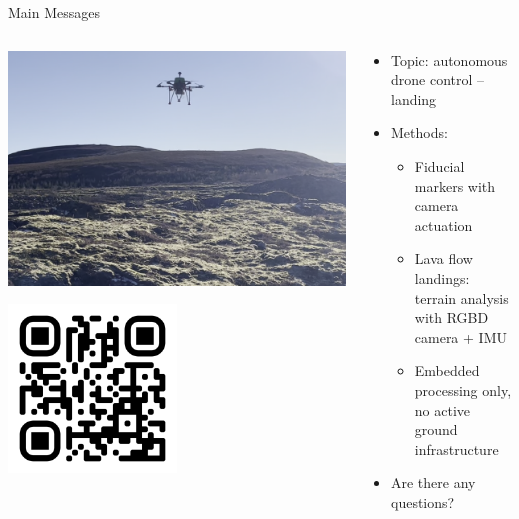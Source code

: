\documentclass[aspectratio=169]{beamer}
\begin{document}
\begin{frame}{Main Messages}
\begin{columns}
	\begin{column}{0.4\textwidth}
		\centering
		
		\vspace{1cm}
		\includegraphics[width=\textwidth]{./images/depth_drone_flying}
		
		\includegraphics[width=0.5\textwidth]{./images/qr_uzgit_github_io.png}
	\end{column}
	\begin{column}{0.6\textwidth}
	\begin{itemize}
		\item Topic: autonomous drone control -- landing
		\item Methods:
		\begin{itemize}
			\item Fiducial markers with camera actuation
			\item Lava flow landings: terrain analysis with RGBD camera + IMU
			\item Embedded processing only, no active ground infrastructure
		\end{itemize}
	\item Are there any questions?
	\end{itemize}
	\end{column}
\end{columns}
\end{frame}

%	
%	
\end{document}
